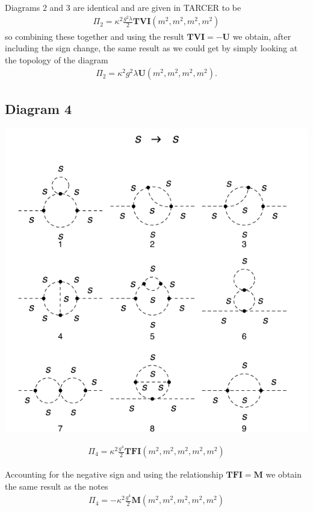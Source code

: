 \documentclass[11pt]{article}
\newcommand{\tarcer}{\textsf{TARCER} \! }
\begin{document}
Diagrams 2 and 3 are identical and are given in \tarcer to be
\begin{align}
\Pi_2 = \kappa^2 \frac{g^2\lambda}{2} \mathbf{TVI}(m^2,m^2,m^2,m^2)
\end{align}
so combining these together and using the result $ \mathbf{TVI}=-\mathbf{U}$ we obtain, after including the sign change, the same result as we could get by simply looking at the topology of the diagram
\begin{align}
\Pi_2 =  \kappa^2 g^2\lambda \mathbf{U}(m^2,m^2,m^2,m^2).
\end{align}



\subsection*{Diagram 4}
\begin{center}
\includegraphics{2loop_4.pdf}
\end{center}
\begin{align}
\Pi_4 = \kappa^2 \frac{g^4}{2} \mathbf{TFI}(m^2,m^2,m^2,m^2,m^2)
\end{align}

Accounting for the negative sign and using the relationship $\mathbf{TFI}=\mathbf{M}$ we obtain the same result as the notes
\begin{align}
\Pi_4 = - \kappa^2 \frac{g^4}{2} \mathbf{M}(m^2,m^2,m^2,m^2,m^2)
\end{align}
\end{document}
